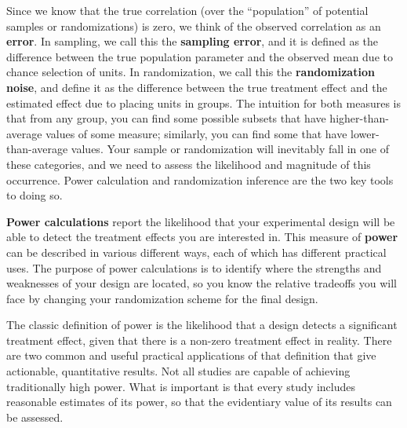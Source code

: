Since we know that the true correlation
(over the ``population'' of potential samples or randomizations)
is zero, we think of the observed correlation as an \textbf{error}.
In sampling, we call this the \textbf{sampling error},
and it is defined as the difference between the true population parameter
and the observed mean due to chance selection of units.
In randomization, we call this the \textbf{randomization noise},
and define it as the difference between the true treatment effect
and the estimated effect due to placing units in groups.
The intuition for both measures is that from any group,
you can find some possible subsets that have higher-than-average values of some measure;
similarly, you can find some that have lower-than-average values.
Your sample or randomization will inevitably fall in one of these categories,
and we need to assess the likelihood and magnitude of this occurrence.
Power calculation and randomization inference are the two key tools to doing so.


\textbf{Power calculations} report the likelihood that your experimental design
will be able to detect the treatment effects you are interested in.
This measure of \textbf{power} can be described in various different ways,
each of which has different practical uses.
The purpose of power calculations is to identify where the strengths and weaknesses
of your design are located, so you know the relative tradeoffs you will face
by changing your randomization scheme for the final design.


The classic definition of power
is the likelihood that a design detects a significant treatment effect,
given that there is a non-zero treatment effect in reality.
There are two common and useful practical applications
of that definition that give actionable, quantitative results.
Not all studies are capable of achieving traditionally high power.
What is important is that every study includes reasonable estimates of its power,
so that the evidentiary value of its results can be assessed.

